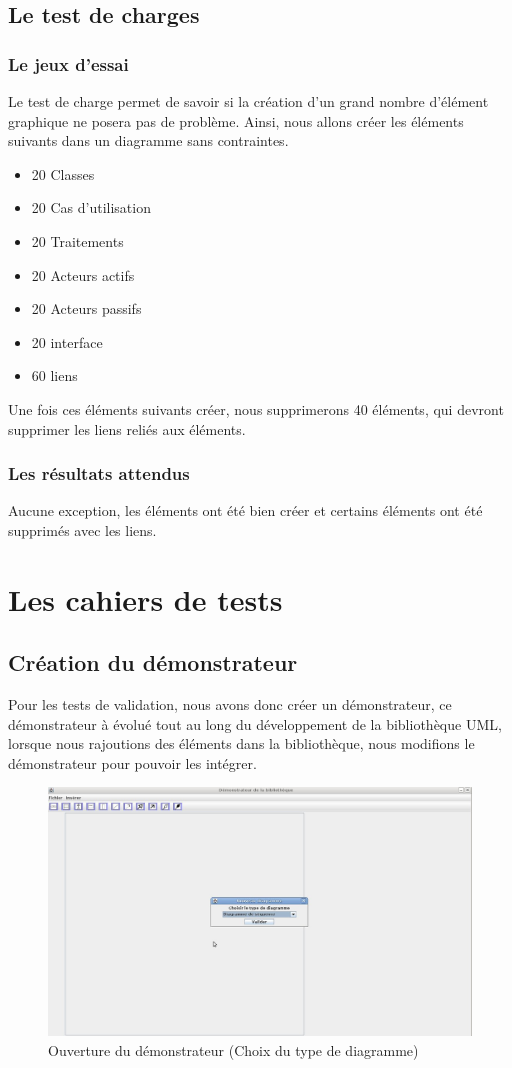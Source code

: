 \documentclass[12pt,a4paper,openany]{report}
\begin{document}
	\section{Le test de charges}
		\subsection{Le jeux d'essai}
		Le test de charge permet de savoir si la création d'un grand nombre d'élément graphique ne posera pas de problème. 
		Ainsi, nous allons créer les éléments suivants dans un diagramme sans contraintes.
		\begin{itemize}
			\item 20 Classes
			\item 20 Cas d'utilisation
			\item 20 Traitements
			\item 20 Acteurs actifs
			\item 20 Acteurs passifs
			\item 20 interface 
			\item 60 liens
		\end{itemize}
		Une fois ces éléments suivants créer, nous supprimerons 40 éléments, qui devront supprimer les liens reliés aux éléments.
		\subsection{Les résultats attendus}
		Aucune exception, les éléments ont été bien créer et certains éléments ont été supprimés avec les liens.
	\chapter{Les cahiers de tests}	
	\section{Création du démonstrateur}
	Pour les tests de validation, nous avons donc créer un démonstrateur, ce démonstrateur à évolué tout au long du développement de la bibliothèque UML, 
	lorsque nous rajoutions des éléments dans la bibliothèque, nous modifions le démonstrateur pour pouvoir les intégrer.
		\begin{figure}[H]
			\centering
			\includegraphics[width=18cm]{choixDiagramme.jpg}
			\caption{Ouverture du démonstrateur (Choix du type de diagramme)}
		\end{figure}
	\newpage
\end{document}
